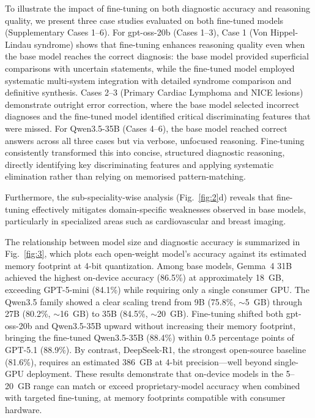 \documentclass[10pt,journal,compsoc, onecolumn]{IEEEtran}
\begin{document}
To illustrate the impact of fine-tuning on both diagnostic accuracy and reasoning quality, we 
present three case studies evaluated on both fine-tuned models (Supplementary Cases 1--6). 
For gpt-oss-20b (Cases 1--3), Case 1 (Von Hippel-Lindau syndrome) shows that fine-tuning 
enhances reasoning quality even when the base model reaches the correct diagnosis: the base 
model provided superficial comparisons with uncertain statements, while the fine-tuned model 
employed systematic multi-system integration with detailed syndrome comparison and definitive 
synthesis. Cases 2--3 (Primary Cardiac Lymphoma and NICE lesions) demonstrate outright error 
correction, where the base model selected incorrect diagnoses and the fine-tuned model 
identified critical discriminating features that were missed. For Qwen3.5-35B (Cases 4--6), 
the base model reached correct answers across all three cases but via verbose, unfocused 
reasoning. Fine-tuning consistently transformed this into concise, structured diagnostic 
reasoning, directly identifying key discriminating features and applying systematic elimination 
rather than relying on memorised pattern-matching.

Furthermore, the sub-speciality-wise analysis (Fig.~\ref{fig:2}d) reveals that fine-tuning effectively mitigates domain-specific weaknesses observed in base models, particularly in specialized areas such as cardiovascular and breast imaging.

The relationship between model size and diagnostic accuracy is summarized in Fig.~\ref{fig:3}, which plots each open-weight model's accuracy against its estimated memory footprint at 4-bit quantization. Among base models, Gemma~4 31B achieved the highest on-device accuracy (86.5\%) at approximately 18~GB, exceeding GPT-5-mini (84.1\%) while requiring only a single consumer GPU. The Qwen3.5 family showed a clear scaling trend from 9B (75.8\%, ${\sim}$5~GB) through 27B (80.2\%, ${\sim}$16~GB) to 35B (84.5\%, ${\sim}$20~GB). Fine-tuning shifted both gpt-oss-20b and Qwen3.5-35B upward without increasing their memory footprint, bringing the fine-tuned Qwen3.5-35B (88.4\%) within 0.5 percentage points of GPT-5.1 (88.9\%). By contrast, DeepSeek-R1, the strongest open-source baseline (81.6\%), requires an estimated 386~GB at 4-bit precision---well beyond single-GPU deployment. These results demonstrate that on-device models in the 5--20~GB range can match or exceed proprietary-model accuracy when combined with targeted fine-tuning, at memory footprints compatible with consumer hardware.
\end{document}
